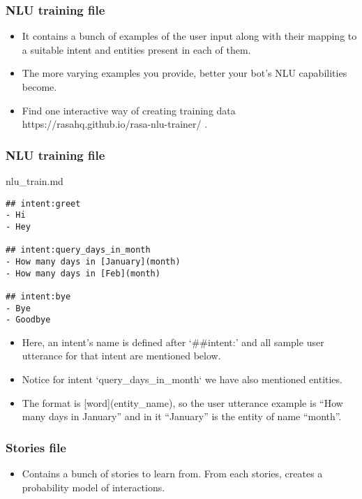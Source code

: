  \begin{frame}[fragile]\frametitle{NLU training file}
 
\begin{itemize}
\item It contains a bunch of examples of the user input along with their mapping to a suitable intent and entities present in each of them. 
\item The more varying examples you provide, better your bot’s NLU capabilities become. 
\item Find one interactive way of creating training data https://rasahq.github.io/rasa-nlu-trainer/ .
\end{itemize}

\end{frame}

 \begin{frame}[fragile]\frametitle{NLU training file}
 nlu\_train.md

\begin{lstlisting}
## intent:greet
- Hi
- Hey

## intent:query_days_in_month
- How many days in [January](month)
- How many days in [Feb](month)

## intent:bye
- Bye
- Goodbye
\end{lstlisting}

\begin{itemize}
\item Here, an intent’s name is defined after ‘\#\#intent:’ and all sample user utterance for that intent are mentioned below. 
\item Notice for intent `query\_days\_in\_month` we have also mentioned entities. 
\item The format is [word](entity\_name), so the user utterance example is “How many days in January” and in it “January” is the entity of name “month”.
\end{itemize}


\end{frame}



 \begin{frame}[fragile]\frametitle{Stories file}
 
\begin{itemize}
\item Contains a bunch of stories to learn from. From each stories, creates a probability model of interactions.
\end{itemize}

\end{frame}

